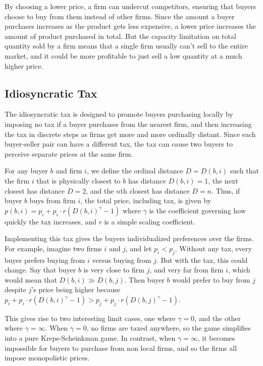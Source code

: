 \documentclass[11pt]{article}
\begin{document}
By choosing a lower price, a firm can undercut competitors, ensuring that
buyers choose to buy from them instead of other firms. Since the amount a buyer
purchases increases as the product gets less expensive, a lower price increases
the amount of product purchased in total. But the capacity limitation on total
quantity sold by a firm means that a single firm usually can't sell to the
entire market, and it could be more profitable to just sell a low quantity at a much higher price.

\subsection{Idiosyncratic Tax}
The idiosyncratic tax is designed to promote buyers purchasing locally by
imposing no tax if a buyer purchases from the nearest firm, and then increasing
the tax in discrete steps as firms get more and more ordinally distant. Since
each buyer-seller pair can have a different tax, the tax can cause two buyers
to perceive separate prices at the same firm.

For any buyer $b$ and firm $i$, we define the ordinal distance $D = D(b,i)$
such that the firm $i$ that is physically closest to $b$ has distance
$D(b,i)=1$, the next closest has distance $D=2$, and the $n$th closest has
distance $D=n$.  Thus, if buyer $b$ buys from firm $i$, the total price,
including tax, is given by $p(b,i) = p_i + p_i \cdot r(D(b,i)^\gamma -1)$
where $\gamma$ is the coefficient governing how quickly the tax increases, and
$r$ is a simple scaling coefficient.

Implementing this tax gives the buyers individualized preferences
over the firms. For example, imagine two firms $i$ and $j$, and let $p_i <
p_j$. Without any tax, every buyer prefers buying from $i$ versus buying from
$j$. But with the tax, this could change. Say that buyer $b$ is very close to
firm $j$, and very far from firm $i$, which would mean that $D(b,i) \gg
D(b,j)$. Then buyer $b$ would prefer to buy from $j$ despite $j$'s price
being higher because $p_i + p_i\cdot r(D(b,i)^\gamma - 1) > p_j + p_j\cdot
r(D(b,j)^\gamma -1)$. 

This gives rise to two interesting limit cases, one where $\gamma = 0$, and the
other where $\gamma = \infty$. When $\gamma = 0$, no firms are taxed anywhere,
so the game simplifies into a pure Kreps-Scheinkman game. In contrast, when
$\gamma = \infty$, it becomes impossible for buyers to purchase from non local
firms, and so the firms all impose monopolistic prices.
\end{document}
